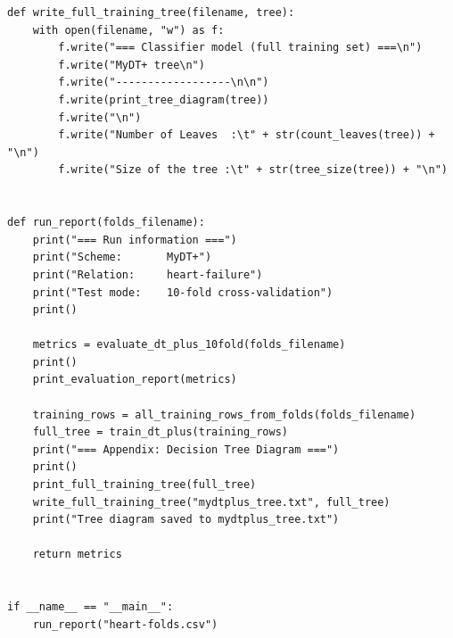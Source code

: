 \documentclass[12pt,a4paper]{article}
\begin{document}
{\begin{verbatim}
def write_full_training_tree(filename, tree):
    with open(filename, "w") as f:
        f.write("=== Classifier model (full training set) ===\n")
        f.write("MyDT+ tree\n")
        f.write("------------------\n\n")
        f.write(print_tree_diagram(tree))
        f.write("\n")
        f.write("Number of Leaves  :\t" + str(count_leaves(tree)) + "\n")
        f.write("Size of the tree :\t" + str(tree_size(tree)) + "\n")


def run_report(folds_filename):
    print("=== Run information ===")
    print("Scheme:       MyDT+")
    print("Relation:     heart-failure")
    print("Test mode:    10-fold cross-validation")
    print()

    metrics = evaluate_dt_plus_10fold(folds_filename)
    print()
    print_evaluation_report(metrics)

    training_rows = all_training_rows_from_folds(folds_filename)
    full_tree = train_dt_plus(training_rows)
    print("=== Appendix: Decision Tree Diagram ===")
    print()
    print_full_training_tree(full_tree)
    write_full_training_tree("mydtplus_tree.txt", full_tree)
    print("Tree diagram saved to mydtplus_tree.txt")

    return metrics


if __name__ == "__main__":
    run_report("heart-folds.csv")
\end{verbatim}
}
\end{document}
